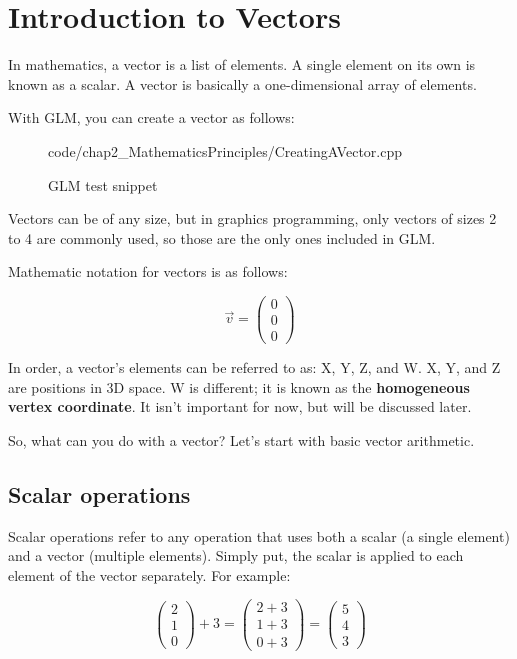 \section{\textsf{Introduction to Vectors}}
In mathematics, a vector is a list of elements. A single element on its own is known as a scalar. A vector is basically a one-dimensional array of elements.

With GLM, you can create a vector as follows:

\begin{frame}{}
    \begin{figure}[ht]
    \centering
    \colorbox{backgroundcolor}{
        \parbox{0.9\textwidth}{
            
            {code/chap2_MathematicsPrinciples/CreatingAVector.cpp}
        }
    }
    \caption{GLM test snippet}
    \label{fig:creatingAVector}
    \end{figure}
\end{frame}

Vectors can be of any size, but in graphics programming, only vectors of sizes 2 to 4 are commonly used, so those are the only ones included in GLM.

Mathematic notation for vectors is as follows:

\begin{equation*}
    \vec{v} =\begin{pmatrix}
    0\\
    0\\
    0
    \end{pmatrix}
\end{equation*}

In order, a vector's elements can be referred to as: X, Y, Z, and W. X, Y, and Z are positions in 3D space. W is different; it is known as the \textbf{homogeneous vertex coordinate}. It isn't important for now, but will be discussed later.

So, what can you do with a vector? Let's start with basic vector arithmetic.

\subsection{\textsf{Scalar operations}}
Scalar operations refer to any operation that uses both a scalar (a single element) and a vector (multiple elements). Simply put, the scalar is applied to each element of the vector separately. For example:

\begin{equation*}
\begin{pmatrix}
2\\
1\\
0
\end{pmatrix} +3=\begin{pmatrix}
2+3\\
1+3\\
0+3
\end{pmatrix} =\begin{pmatrix}
5\\
4\\
3
\end{pmatrix}
\end{equation*}

